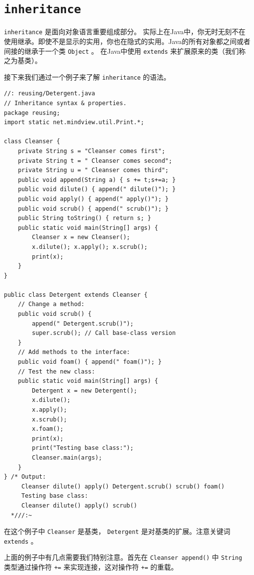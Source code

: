 \documentclass[10pt,a4paper,UTF8]{article}
\begin{document}
\section{\texttt{inheritance}}
\label{sec:org4716ce1}


\texttt{inheritance} 是面向对象语言重要组成部分。 实际上在Java中，你无时无刻不在使用继承。即使不是显示的实用，你也在隐式的实用。Java的所有对象都之间或者间接的继承于一个类 \texttt{Object} 。 在Java中使用 \texttt{extends} 来扩展原来的类（我们称之为基类）。

接下来我们通过一个例子来了解 \texttt{inheritance} 的语法。

\lstset{language=C,label= ,caption= ,captionpos=b,firstnumber=1,numbers=left}
\begin{lstlisting}
//: reusing/Detergent.java
// Inheritance syntax & properties.
package reusing;
import static net.mindview.util.Print.*;

class Cleanser {
    private String s = "Cleanser comes first";
    private String t = " Cleanser comes second";
    private String u = " Cleanser comes third";
    public void append(String a) { s += t;s+=a; }
    public void dilute() { append(" dilute()"); }
    public void apply() { append(" apply()"); }
    public void scrub() { append(" scrub()"); }
    public String toString() { return s; }
    public static void main(String[] args) {
        Cleanser x = new Cleanser();
        x.dilute(); x.apply(); x.scrub();
        print(x);
    }
}

public class Detergent extends Cleanser {
    // Change a method:
    public void scrub() {
        append(" Detergent.scrub()");
        super.scrub(); // Call base-class version
    }
    // Add methods to the interface:
    public void foam() { append(" foam()"); }
    // Test the new class:
    public static void main(String[] args) {
        Detergent x = new Detergent();
        x.dilute();
        x.apply();
        x.scrub();
        x.foam();
        print(x);
        print("Testing base class:");
        Cleanser.main(args);
    }
} /* Output:
     Cleanser dilute() apply() Detergent.scrub() scrub() foam()
     Testing base class:
     Cleanser dilute() apply() scrub()
  *///:~
\end{lstlisting}
在这个例子中 \texttt{Cleanser} 是基类， \texttt{Detergent} 是对基类的扩展。注意关键词 \texttt{extends} 。

上面的例子中有几点需要我们特别注意。首先在 \texttt{Cleanser append()} 中 \texttt{String} 类型通过操作符 \texttt{+=} 来实现连接，这对操作符 \texttt{+=} 的重载。
\end{document}
